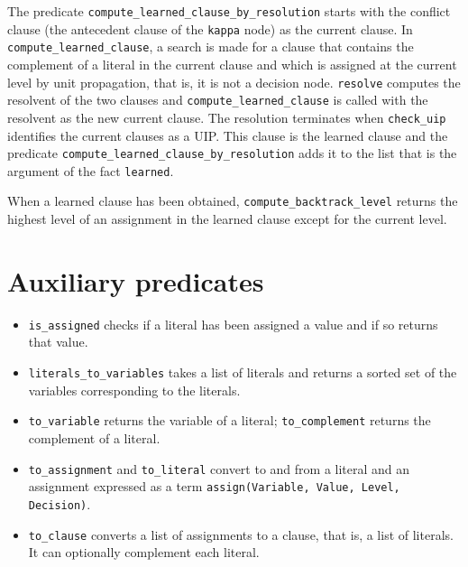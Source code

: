 \documentclass[11pt]{report}
\newcommand*{\p}[1]{\textup{\texttt{#1}}}
\begin{document}
The predicate \p{compute\_learned\_clause\_by\_resolution} starts with
the conflict clause (the antecedent clause of the \p{kappa} node) as the
current clause. In \p{compute\_learned\_clause}, a search is made for a
clause that contains the complement of a literal in the current clause
and which is assigned at the current level by unit propagation, that is,
it is not a decision node. \p{resolve} computes the resolvent of the two
clauses and \p{compute\_learned\_clause} is called with the resolvent as
the new current clause. The resolution terminates when \p{check\_uip}
identifies the current clauses as a UIP. This clause is the learned
clause and the predicate \p{compute\_learned\_clause\_by\_resolution}
adds it to the list that is the argument of the fact \p{learned}.

When a learned clause has been obtained, \p{compute\_backtrack\_level}
returns the highest level of an assignment in the learned clause except
for the current level.


\section{Auxiliary predicates}\label{s.aux}

\begin{itemize}

\item \p{is\_assigned} checks if a literal has been assigned a value
and if so returns that value.

\item \p{literals\_to\_variables} takes a list of literals and returns a
sorted set of the variables corresponding to the literals.

\item \p{to\_variable} returns the variable of a literal;
\p{to\_complement} returns the complement of a literal.

\item \p{to\_assignment} and \p{to\_literal} convert to and from a
literal and an assignment expressed as a term \p{assign(Variable, Value,
Level, Decision)}.

\item \p{to\_clause} converts a list of assignments to a clause, that
is, a list of literals. It can optionally complement each literal.

\end{itemize}




\end{document}
